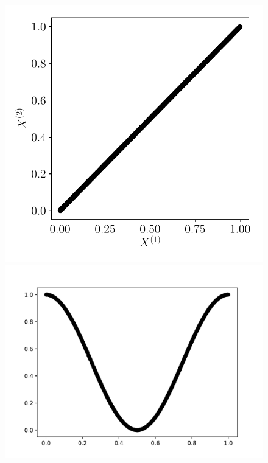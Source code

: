 \documentclass[../main]{subfiles}
\begin{document}
\begin{figure}
	\begin{minipage}{\textwidth}
		\begin{minipage}{0.33\textwidth}
			\includegraphics[width=\textwidth]{2som_id_in.pdf}
		\end{minipage}
		\begin{minipage}{0.33\textwidth}
			\includegraphics[width=\textwidth]{2som_courbe000_inputs.pdf}
		\end{minipage}

\end{minipage}
\end{figure}
\end{document}
